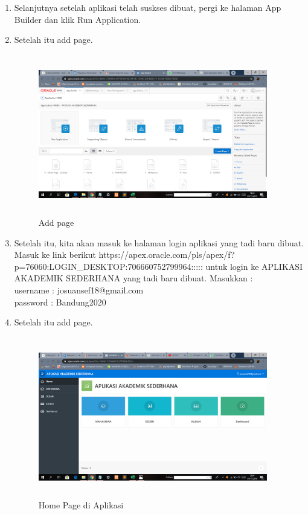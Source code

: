 \begin{enumerate}
\item Selanjutnya setelah aplikasi telah suskses dibuat, pergi ke halaman App Builder dan klik Run Application.

\item  Setelah itu add page.
\begin{figure}[!htbp]
\centering
\includegraphics[width=10cm,height=7cm]{figures/31run.png}
\caption{Add page}
\label{penanda}
\end{figure}

\item Setelah itu, kita akan masuk ke halaman login aplikasi yang tadi baru dibuat. 
\\ Masuk ke link berikut {https://apex.oracle.com/pls/apex/f?p=76060:LOGIN_DESKTOP:706660752799964:::::} untuk login ke APLIKASI AKADEMIK SEDERHANA yang tadi baru dibuat. Masukkan :
\\ username : josuansef18@gmail.com
\\ password : Bandung2020

\item  Setelah itu add page.
\begin{figure}[!htbp]
\centering
\includegraphics[width=10cm,height=7cm]{figures/32home.png}
\caption{Home Page di Aplikasi}
\label{penanda}
\end{figure}
\end{enumerate}

